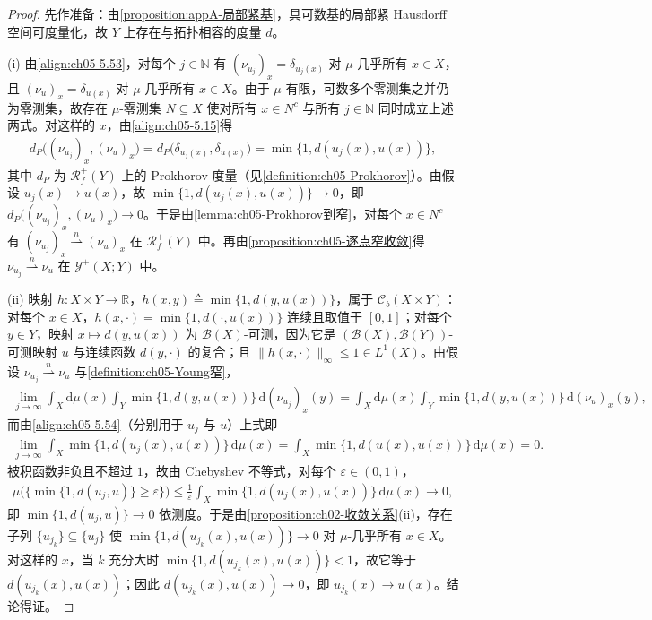 \documentclass[../../main.tex]{subfiles}%
\begin{document}
\begin{proof}
先作准备：由\cref{proposition:appA-局部紧基}，具可数基的局部紧 Hausdorff 空间可度量化，故 $Y$ 上存在与拓扑相容的度量 $d$。

(i) 由\eqref{align:ch05-5.53}，对每个 $j\in\mathbb{N}$ 有 $(\nu_{u_j})_x=\delta_{u_j(x)}$ 对 $\mu$-几乎所有 $x\in X$，且 $(\nu_u)_x=\delta_{u(x)}$ 对 $\mu$-几乎所有 $x\in X$。由于 $\mu$ 有限，可数多个零测集之并仍为零测集，故存在 $\mu$-零测集 $N\subseteq X$ 使对所有 $x\in N^c$ 与所有 $j\in\mathbb{N}$ 同时成立上述两式。对这样的 $x$，由\eqref{align:ch05-5.15}得
\begin{align*}
d_P\big((\nu_{u_j})_x,(\nu_u)_x\big)=d_P\big(\delta_{u_j(x)},\delta_{u(x)}\big)=\min\{1,d(u_j(x),u(x))\},
\end{align*}
其中 $d_P$ 为 $\mathscr{R}^+_f(Y)$ 上的 Prokhorov 度量（见\cref{definition:ch05-Prokhorov}）。由假设 $u_j(x)\to u(x)$，故 $\min\{1,d(u_j(x),u(x))\}\to0$，即 $d_P\big((\nu_{u_j})_x,(\nu_u)_x\big)\to0$。于是由\cref{lemma:ch05-Prokhorov到窄}，对每个 $x\in N^c$ 有 $(\nu_{u_j})_x\stackrel{n}{\rightharpoonup}(\nu_u)_x$ 在 $\mathscr{R}^+_f(Y)$ 中。再由\cref{proposition:ch05-逐点窄收敛}得 $\nu_{u_j}\stackrel{n}{\rightharpoonup}\nu_u$ 在 $\mathcal{Y}^+(X;Y)$ 中。

(ii) 映射 $h:X\times Y\to\mathbb{R}$，$h(x,y)\triangleq\min\{1,d(y,u(x))\}$，属于 $\mathcal{C}_b(X\times Y)$：对每个 $x\in X$，$h(x,\cdot)=\min\{1,d(\cdot,u(x))\}$ 连续且取值于 $[0,1]$；对每个 $y\in Y$，映射 $x\mapsto d(y,u(x))$ 为 $\mathscr{B}(X)$-可测，因为它是 $(\mathscr{B}(X),\mathscr{B}(Y))$-可测映射 $u$ 与连续函数 $d(y,\cdot)$ 的复合；且 $\|h(x,\cdot)\|_\infty\leqslant1\in L^1(X)$。由假设 $\nu_{u_j}\stackrel{n}{\rightharpoonup}\nu_u$ 与\cref{definition:ch05-Young窄}，
\begin{align*}
\lim_{j\to\infty}\int_X\mathrm{d}\mu(x)\int_Y\min\{1,d(y,u(x))\}\,\mathrm{d}(\nu_{u_j})_x(y)
=\int_X\mathrm{d}\mu(x)\int_Y\min\{1,d(y,u(x))\}\,\mathrm{d}(\nu_u)_x(y),
\end{align*}
而由\eqref{align:ch05-5.54}（分别用于 $u_j$ 与 $u$）上式即
\begin{align*}
\lim_{j\to\infty}\int_X\min\{1,d(u_j(x),u(x))\}\,\mathrm{d}\mu(x)
=\int_X\min\{1,d(u(x),u(x))\}\,\mathrm{d}\mu(x)=0.
\end{align*}
被积函数非负且不超过 $1$，故由 Chebyshev 不等式，对每个 $\varepsilon\in(0,1)$，
\begin{align*}
\mu\big(\{\min\{1,d(u_j,u)\}\geqslant\varepsilon\}\big)
\leqslant\frac{1}{\varepsilon}\int_X\min\{1,d(u_j(x),u(x))\}\,\mathrm{d}\mu(x)\to0,
\end{align*}
即 $\min\{1,d(u_j,u)\}\to0$ 依测度。于是由\cref{proposition:ch02-收敛关系}(ii)，存在子列 $\{u_{j_k}\}\subseteq\{u_j\}$ 使 $\min\{1,d(u_{j_k}(x),u(x))\}\to0$ 对 $\mu$-几乎所有 $x\in X$。对这样的 $x$，当 $k$ 充分大时 $\min\{1,d(u_{j_k}(x),u(x))\}<1$，故它等于 $d(u_{j_k}(x),u(x))$；因此 $d(u_{j_k}(x),u(x))\to0$，即 $u_{j_k}(x)\to u(x)$。结论得证。
\end{proof}
\end{document}
